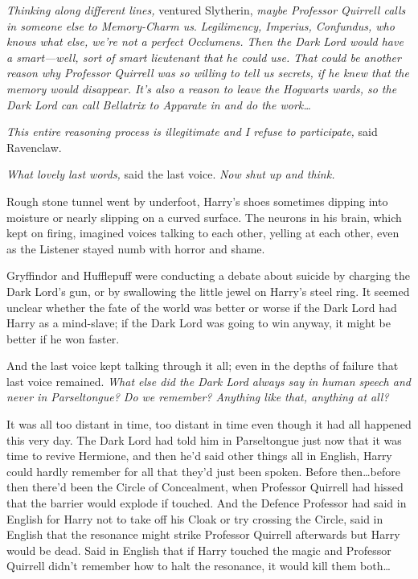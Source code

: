 \emph{Thinking along different lines,} ventured Slytherin, \emph{maybe Professor Quirrell calls in someone else to Memory-Charm us}. \emph{Legilimency, Imperius, Confundus, who knows what else, we’re not a perfect Occlumens. Then the Dark Lord would have a smart—well, sort of smart lieutenant that he could use. That could be another reason why Professor Quirrell was so willing to tell us secrets, if he knew that the memory would disappear. It’s also a reason to leave the Hogwarts wards, so the Dark Lord can call Bellatrix to Apparate in and do the work…}

\emph{This entire reasoning process is illegitimate and I refuse to participate,} said Ravenclaw.

\emph{What lovely last words,} said the last voice. \emph{Now shut up and think.}

Rough stone tunnel went by underfoot, Harry’s shoes sometimes dipping into moisture or nearly slipping on a curved surface. The neurons in his brain, which kept on firing, imagined voices talking to each other, yelling at each other, even as the Listener stayed numb with horror and shame.

Gryffindor and Hufflepuff were conducting a debate about suicide by charging the Dark Lord’s gun, or by swallowing the little jewel on Harry’s steel ring. It seemed unclear whether the fate of the world was better or worse if the Dark Lord had Harry as a mind-slave; if the Dark Lord was going to win anyway, it might be better if he won faster.

And the last voice kept talking through it all; even in the depths of failure that last voice remained. \emph{What else did the Dark Lord always say in human speech and never in Parseltongue? Do we remember? Anything like that, anything at all?}

It was all too distant in time, too distant in time even though it had all happened this very day. The Dark Lord had told him in Parseltongue just now that it was time to revive Hermione, and then he’d said other things all in English, Harry could hardly remember for all that they’d just been spoken. Before then…before then there’d been the Circle of Concealment, when Professor Quirrell had hissed that the barrier would explode if touched. And the Defence Professor had said in English for Harry not to take off his Cloak or try crossing the Circle, said in English that the resonance might strike Professor Quirrell afterwards but Harry would be dead. Said in English that if Harry touched the magic and Professor Quirrell didn’t remember how to halt the resonance, it would kill them both…

